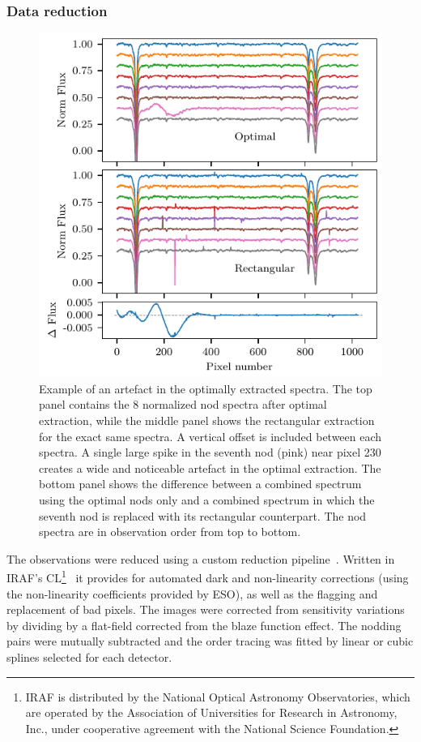 \documentclass[fleqn,usenatbib]{mnras}
\newcommand*\rd{\color{red}}
\begin{document}



\subsubsection{Data reduction}
\label{subsubsec:reduction}
\begin{figure}
    \includegraphics[width=\hsize]{images/Bad_pixel_replacement.pdf} %
    \caption{Example of an artefact in the optimally extracted spectra. The top panel contains the 8 normalized nod spectra after optimal extraction, while the middle panel shows the rectangular extraction for the exact same spectra. A vertical offset is included between each spectra. A single large spike in the seventh nod (pink) near pixel 230 creates a wide and noticeable artefact in the optimal extraction. The bottom panel shows the difference between a combined spectrum using the optimal nods only and a combined spectrum in which the seventh nod is replaced with its rectangular counterpart. The nod spectra are in observation order from top to bottom.}
    \label{fig:nod_artefacts}
\end{figure}

The observations were reduced using a custom reduction pipeline~\citep{figueira_radial_2010}. Written in IRAF's CL\footnote{IRAF is distributed by the National Optical Astronomy Observatories, which are operated by the Association of Universities for Research in Astronomy, {Inc.}, under cooperative agreement with the National Science Foundation.}~\citep{tody_iraf_1993} it provides for automated dark and non-linearity corrections (using the non-linearity coefficients provided by ESO), as well as the flagging and replacement of bad pixels. The images were corrected from sensitivity variations by dividing by a flat-field corrected from the blaze function effect. The nodding pairs were mutually subtracted and the order tracing was fitted by {\rd linear or cubic splines selected for each detector}.
\end{document}
